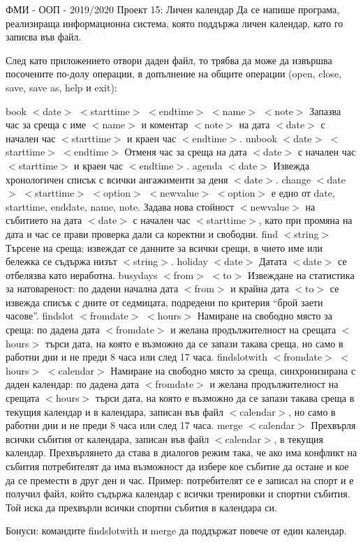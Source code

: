 ФМИ -\/ ООП -\/ 2019/2020 Проект 15\+: Личен календар Да се напише програма, реализираща информационна система, която поддържа личен календар, като го записва във файл.

След като приложението отвори даден файл, то трябва да може да извършва посочените по-\/долу операции, в допълнение на общите операции (open, close, save, save as, help и exit)\+:

book $<$date$>$ $<$starttime$>$ $<$endtime$>$ $<$name$>$ $<$note$>$ Запазва час за среща с име $<$name$>$ и коментар $<$note$>$ на дата $<$date$>$ с начален час $<$starttime$>$ и краен час $<$endtime$>$. unbook $<$date$>$ $<$starttime$>$ $<$endtime$>$ Отменя час за среща на дата $<$date$>$ с начален час $<$starttime$>$ и краен час $<$endtime$>$. agenda $<$date$>$ Извежда хронологичен списък с всички ангажименти за деня $<$date$>$. change $<$date$>$ $<$starttime$>$ $<$option$>$ $<$newvalue$>$ $<$option$>$ е едно от date, starttime, enddate, name, note. Задава нова стойност $<$newvalue$>$ на събитието на дата $<$date$>$ с начален час $<$starttime$>$, като при промяна на дата и час се прави проверка дали са коректни и свободни. find $<$string$>$ Търсене на среща\+: извеждат се данните за всички срещи, в чието име или бележка се съдържа низът $<$string$>$. holiday $<$date$>$ Датата $<$date$>$ се отбелязва като неработна. busydays $<$from$>$ $<$to$>$ Извеждане на статистика за натовареност\+: по дадени начална дата $<$from$>$ и крайна дата $<$to$>$ се извежда списък с дните от седмицата, подредени по критерия “брой заети часове”. findslot $<$fromdate$>$ $<$hours$>$ Намиране на свободно място за среща\+: по дадена дата $<$fromdate$>$ и желана продължителност на срещата $<$hours$>$ търси дата, на която е възможно да се запази такава среща, но само в работни дни и не преди 8 часа или след 17 часа. findslotwith $<$fromdate$>$ $<$hours$>$ $<$calendar$>$ Намиране на свободно място за среща, синхронизирана с даден календар\+: по дадена дата $<$fromdate$>$ и желана продължителност на срещата $<$hours$>$ търси дата, на която е възможно да се запази такава среща в текущия календар и в календара, записан във файл $<$calendar$>$, но само в работни дни и не преди 8 часа или след 17 часа. merge $<$calendar$>$ Прехвърля всички събития от календара, записан във файл $<$calendar$>$, в текущия календар. Прехвърлянето да става в диалогов режим така, че ако има конфликт на събития потребителят да има възможност да избере кое събитие да остане и кое да се премести в друг ден и час. Пример\+: потребителят се е записал на спорт и е получил файл, който съдържа календар с всички тренировки и спортни събития. Той иска да прехвърли всички спортни събития в календара си.

Бонуси\+: командите findslotwith и merge да поддържат повече от един календар. 